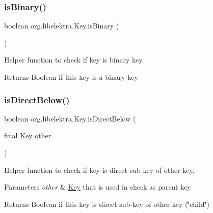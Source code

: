 \subsubsection{\texorpdfstring{is\+Binary()}{isBinary()}}
{\footnotesize\ttfamily boolean org.\+libelektra.\+Key.\+is\+Binary (\begin{DoxyParamCaption}{ }\end{DoxyParamCaption})\hspace{0.3cm}{\ttfamily [inline]}}



Helper function to check if key is binary key. 

\begin{DoxyReturn}{Returns}
Boolean if this key is a binary key 
\end{DoxyReturn}
\mbox{\label{classorg_1_1libelektra_1_1Key_a799b0577d5e1491702e45566c943bda4}} 
\subsubsection{\texorpdfstring{is\+Direct\+Below()}{isDirectBelow()}}
{\footnotesize\ttfamily boolean org.\+libelektra.\+Key.\+is\+Direct\+Below (\begin{DoxyParamCaption}\item[{final \hyperlink{classorg_1_1libelektra_1_1Key}{Key}}]{other }\end{DoxyParamCaption})\hspace{0.3cm}{\ttfamily [inline]}}



Helper function to check if key is direct sub-\/key of other key. 


\begin{DoxyParams}{Parameters}
{\em other} & \hyperlink{classorg_1_1libelektra_1_1Key}{Key} that is used in check as parent key \\
\hline
\end{DoxyParams}
\begin{DoxyReturn}{Returns}
Boolean if this key is direct sub-\/key of other key (\char`\"{}child\char`\"{}) 
\end{DoxyReturn}
\mbox{\label{classorg_1_1libelektra_1_1Key_adfcebdd407d050b0626a8f2cfec00e8b}} 
